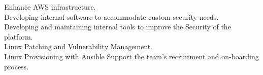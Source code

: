 \documentclass[
	a4paper,
]{fortysecondscv}
\begin{document}
\begin{cvtable}[1.5]
		{
    Enhance AWS infrastructure.\\
    Developing internal software to accommodate custom security needs.\\
    Developing and maintaining internal tools to improve the Security of the platform.\\
    Linux Patching and Vulnerability Management.\\
    Linux Provisioning with Ansible
    Support the team's recruitment and on-boarding process.
        }

		{
  }

		{
  }


\end{cvtable}







\begin{cvtable}
\end{cvtable}
\end{document}
